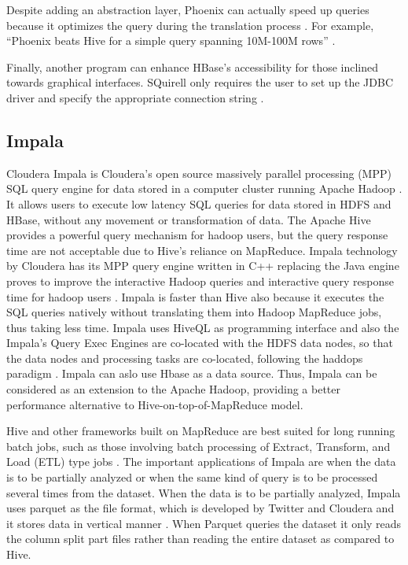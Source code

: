      Despite adding an abstraction layer, Phoenix can actually speed
     up queries because it optimizes the query during the translation
     process \cite{www-phoenix-cloudera}. For example, ``Phoenix
     beats Hive for a simple query spanning 10M-100M rows''
     \cite{www-phoenix-infoq}.

     Finally, another program can enhance HBase's accessibility for
     those inclined towards graphical interfaces.  SQuirell only
     requires the user to set up the JDBC driver and specify the
     appropriate connection string \cite{www-phoenix-bighadoop}.

     \pv

\subsection{Impala}

     Cloudera Impala is Cloudera's open source massively parallel
     processing (MPP) SQL query engine for data stored in a computer
     cluster running Apache Hadoop \cite{www-impala-cloudera}. It
     allows users to execute low latency SQL queries for data stored
     in HDFS and HBase, without any movement or transformation of
     data. The Apache Hive provides a powerful query mechanism for
     hadoop users, but the query response time are not acceptable due
     to Hive's reliance on MapReduce. Impala technology by Cloudera
     has its MPP query engine written in C++ replacing the Java engine
     proves to improve the interactive Hadoop queries and interactive
     query response time for hadoop users \cite{www-impala-dummies}
     . Impala is faster than Hive also because it executes the SQL
     queries natively without translating them into Hadoop MapReduce
     jobs, thus taking less time. Impala uses HiveQL as programming
     interface and also the Impala's Query Exec Engines are co-located
     with the HDFS data nodes, so that the data nodes and processing
     tasks are co-located, following the haddops paradigm
     \cite{www-impala-dummies}.  Impala can aslo use Hbase as a data
     source. Thus, Impala can be considered as an extension to the
     Apache Hadoop, providing a better performance alternative to
     Hive-on-top-of-MapReduce model.

     Hive and other frameworks built on MapReduce are best suited for
     long running batch jobs, such as those involving batch processing
     of Extract, Transform, and Load (ETL) type jobs
     \cite{www-impala-cloudera}.  The important applications of
     Impala are when the data is to be partially analyzed or when the
     same kind of query is to be processed several times from the
     dataset. When the data is to be partially analyzed, Impala uses
     parquet as the file format, which is developed by Twitter and
     Cloudera and it stores data in vertical manner
     \cite{www-impala-beginner}. When Parquet queries the dataset it
     only reads the column split part files rather than reading the
     entire dataset as compared to Hive.
     
